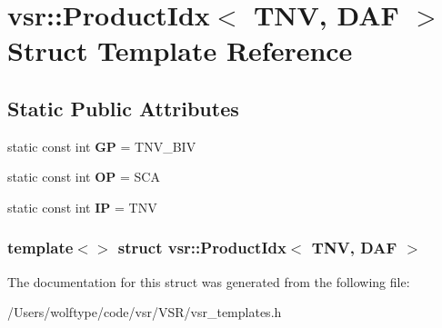 \hypertarget{structvsr_1_1_product_idx_3_01_t_n_v_00_01_d_a_f_01_4}{\section{vsr\-:\-:Product\-Idx$<$ T\-N\-V, D\-A\-F $>$ Struct Template Reference}
\label{structvsr_1_1_product_idx_3_01_t_n_v_00_01_d_a_f_01_4}
}
\subsection*{Static Public Attributes}
\begin{DoxyCompactItemize}
\item 
\hypertarget{structvsr_1_1_product_idx_3_01_t_n_v_00_01_d_a_f_01_4_afa632f81385aaa57fdb50e6c101d52c7}{static const int {\bfseries G\-P} = T\-N\-V\-\_\-\-B\-I\-V}\label{structvsr_1_1_product_idx_3_01_t_n_v_00_01_d_a_f_01_4_afa632f81385aaa57fdb50e6c101d52c7}

\item 
\hypertarget{structvsr_1_1_product_idx_3_01_t_n_v_00_01_d_a_f_01_4_aac4711c274fb77207418c7d7f274b2b3}{static const int {\bfseries O\-P} = S\-C\-A}\label{structvsr_1_1_product_idx_3_01_t_n_v_00_01_d_a_f_01_4_aac4711c274fb77207418c7d7f274b2b3}

\item 
\hypertarget{structvsr_1_1_product_idx_3_01_t_n_v_00_01_d_a_f_01_4_a8b42b486fb53ec73c974b048409ba389}{static const int {\bfseries I\-P} = T\-N\-V}\label{structvsr_1_1_product_idx_3_01_t_n_v_00_01_d_a_f_01_4_a8b42b486fb53ec73c974b048409ba389}

\end{DoxyCompactItemize}
\subsubsection*{template$<$$>$ struct vsr\-::\-Product\-Idx$<$ T\-N\-V, D\-A\-F $>$}



The documentation for this struct was generated from the following file\-:\begin{DoxyCompactItemize}
\item 
/\-Users/wolftype/code/vsr/\-V\-S\-R/vsr\-\_\-templates.\-h\end{DoxyCompactItemize}
